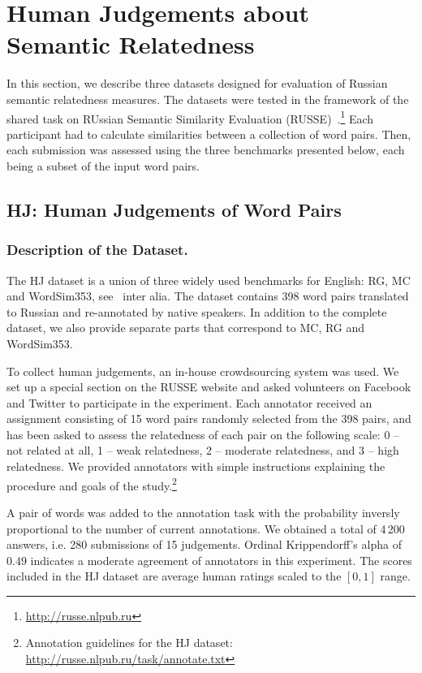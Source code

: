 \documentclass[runningheads,a4paper]{llncs}
\begin{document}
\section{Human Judgements about Semantic Relatedness}\label{sec:human}

In this section, we describe  three datasets designed for evaluation of Russian semantic relatedness measures. The datasets were tested in the framework of the  shared task on RUssian Semantic Similarity Evaluation (RUSSE)~\cite{Panchenko:15}.\footnote{\url{http://russe.nlpub.ru}} Each participant had to calculate similarities between a collection of word pairs. Then, each submission was assessed using the three benchmarks presented below, each being a subset of the input word pairs.

\subsection{HJ: Human Judgements of Word Pairs}\label{sub:hj}

\subsubsection{Description of the Dataset.} The HJ dataset is a union of three widely used benchmarks for English: RG, MC and WordSim353, see~\cite{Resnik:95,Lin:98,Patwardhan:06,Patwardhan:06,Zesch:08,Agirre:09} inter alia. The dataset contains 398 word pairs translated to Russian and re-annotated by native speakers. 
In addition to the complete dataset, we also provide separate  parts that correspond to MC, RG and WordSim353.

To collect human judgements,  an in-house crowdsourcing system was used. We set up a special section on the RUSSE website and asked volunteers on Facebook and Twitter
to participate in the experiment. Each annotator received an assignment consisting of 15 word pairs randomly selected from the 398 pairs, and has been asked to assess the relatedness of each pair on the following scale: 0 -- not related at all, 1 -- weak relatedness, 2 -- moderate relatedness, and 3 -- high relatedness. We provided
annotators with simple instructions explaining the procedure and goals of the study.\footnote{Annotation guidelines for the HJ dataset: \url{http://russe.nlpub.ru/task/annotate.txt}} 

A pair of words was added to the annotation task with the probability inversly proportional to the number of current
annotations. We obtained a total of 4\,200 answers, i.e. 280 submissions of 15 judgements. Ordinal Krippendorff's alpha of $0.49$ indicates a moderate agreement of annotators in this experiment. The scores included in the HJ dataset are average human ratings scaled to the $[0,1]$ range.
\end{document}
